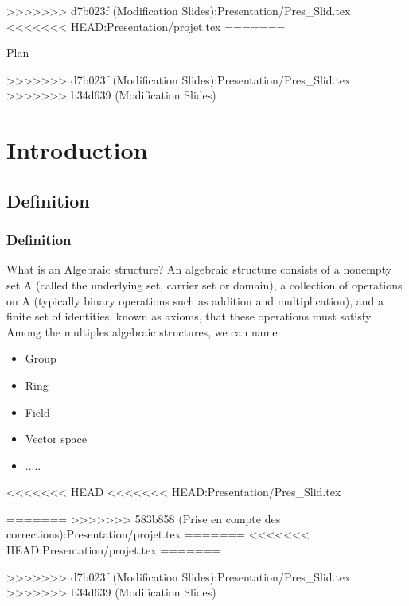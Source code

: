\documentclass{beamer}
\begin{document}
>>>>>>> d7b023f (Modification Slides):Presentation/Pres_Slid.tex
<<<<<<< HEAD:Presentation/projet.tex
=======
\begin{frame}{Plan}
\tableofcontents
\end{frame}


>>>>>>> d7b023f (Modification Slides):Presentation/Pres_Slid.tex
>>>>>>> b34d639 (Modification Slides)
\section{Introduction}


\subsection{Definition}
\begin{frame}
    \frametitle{Definition}
    What is an Algebraic structure? An algebraic structure consists of a nonempty set A (called the underlying set, carrier set or domain), a collection of operations on A (typically binary operations such as addition and multiplication), and a finite set of identities, known as axioms, that these operations must satisfy.
    Among the multiples algebraic structures, we can name:
    \begin{itemize}
        \item Group
        \item Ring
        \item Field
        \item Vector space
        \item .....
    \end{itemize}
\end{frame}
<<<<<<< HEAD
<<<<<<< HEAD:Presentation/Pres_Slid.tex

=======
>>>>>>> 583b858 (Prise en compte des corrections):Presentation/projet.tex
=======
<<<<<<< HEAD:Presentation/projet.tex
=======

>>>>>>> d7b023f (Modification Slides):Presentation/Pres_Slid.tex
>>>>>>> b34d639 (Modification Slides)
\end{document}
